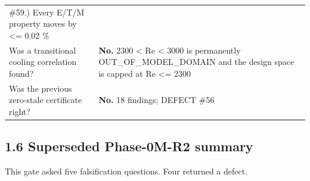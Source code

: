 \documentclass[10pt,]{article}
\begin{document}
\begin{longtable}[]{@{}ll@{}}
\begin{minipage}[t]{0.47\columnwidth}
{\#59.)} Every E/T/M property moves by \textless{}= 0.02 \%\strut
\end{minipage}\tabularnewline
\begin{minipage}[t]{0.47\columnwidth}\raggedright
Was a transitional cooling correlation found?\strut
\end{minipage} & \begin{minipage}[t]{0.47\columnwidth}\raggedright
\textbf{No.} 2300 \textless{} Re \textless{} 3000 is permanently
OUT\_OF\_MODEL\_DOMAIN and the design space is capped at Re \textless{}=
2300\strut
\end{minipage}\tabularnewline
\begin{minipage}[t]{0.47\columnwidth}\raggedright
Was the previous zero-stale certificate right?\strut
\end{minipage} & \begin{minipage}[t]{0.47\columnwidth}\raggedright
\textbf{No.} 18 findings; DEFECT \#56\strut
\end{minipage}\tabularnewline
\bottomrule
\end{longtable}

\newpage

\hypertarget{superseded-phase-0m-r2-summary}{%
\subsection{1.6 Superseded Phase-0M-R2
summary}\label{superseded-phase-0m-r2-summary}}

This gate asked five falsification questions. Four returned a defect.
\end{document}
